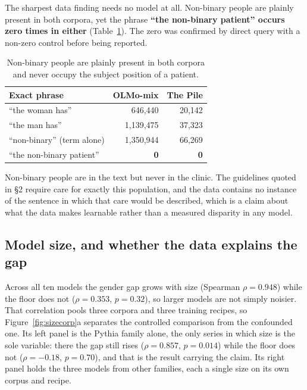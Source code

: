\documentclass[11pt,twocolumn]{article}
\begin{document}
The sharpest data finding needs no model at all. Non-binary people are plainly
present in both corpora, yet the phrase \textbf{``the non-binary patient'' occurs
zero times in either} (Table~\ref{tab:nb}). The zero was confirmed by direct
query with a non-zero control before being reported.

\begin{table}[!t]\centering\small
\caption{Non-binary people are plainly present in both corpora and never occupy the subject position of a patient.}
\label{tab:nb}
\begin{tabular}{@{}lrr@{}}
\toprule
\textbf{Exact phrase} & \textbf{OLMo-mix} & \textbf{The Pile} \\
\midrule
``the woman has'' & 646,440 & 20,142 \\
``the man has'' & 1,139,475 & 37,323 \\
``non-binary'' (term alone) & 1,350,944 & 66,269 \\
``the non-binary patient'' & \textbf{0} & \textbf{0} \\
\bottomrule
\end{tabular}
\end{table} Non-binary people
are in the text but never in the clinic. The guidelines quoted in \S2 require
care for exactly this population, and the data contains no instance of the
sentence in which that care would be described, which is a claim about what the
data makes learnable rather than a measured disparity in any model.

\subsection{Model size, and whether the data explains the gap}
\label{sec:link}

Across all ten models the gender gap grows with size (Spearman $\rho = 0.948$)
while the floor does not ($\rho = 0.353$, $p = 0.32$), so larger models are not
simply noisier. That correlation pools three corpora and three training recipes,
so Figure~\ref{fig:sizecorp}a separates the controlled comparison from the
confounded one. Its left panel is the Pythia family alone, the only series in
which size is the sole variable: there the gap still rises ($\rho = 0.857$,
$p = 0.014$) while the floor does not ($\rho = -0.18$, $p = 0.70$), and that is
the result carrying the claim. Its right panel holds the three models from other
families, each a single size on its own corpus and recipe.
\end{document}
